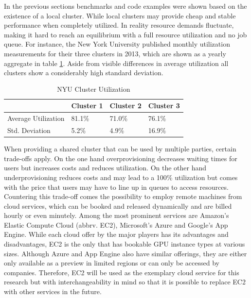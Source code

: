 In the previous sections benchmarks and code examples were shown based on the existence of a local cluster.
While local clusters may provide cheap and stable performance when completely utilized. In reality resource demands fluctuate, making it hard to reach an equilibrium with a full resource utilization and no job queue. For instance, the New York University published monthly utilization measurements for their three clusters in 2013\cite{nyu}, which are shown as a yearly aggregate in table \ref{table:cluster_utilization}. Aside from visible differences in average utilization all clusters show a considerably high standard deviation.

\begin{table}[!htb]
	\centering
	\begin{adjustbox}{width=0.5\textwidth}
		\small
		\begin{tabular}{l | l | l | l}
			~						& Cluster 1	& Cluster 2	& Cluster 3                 \\
			\hline
			Average Utilization 	& 81.1\%  	& 71.0\% 	& 76.1\% \\
			Std. Deviation          & 5.2\%  	& 4.9\%		& 16.9\% \\
		\end{tabular}
	\end{adjustbox}
	
	\caption{NYU Cluster Utilization}
	\label{table:cluster_utilization}
\end{table}

When providing a shared cluster that can be used by multiple parties, certain trade-offs apply. On the one hand overprovisioning decreases waiting times for users but increases costs and reduces utilization. On the other hand underprovisioning reduces costs and may lead to a 100\% utilization but comes with the price that users may have to line up in queues to access resources. Countering this trade-off comes the possibility to employ remote machines from cloud services, which can be booked and released dynamically and are billed hourly or even minutely. Among the most prominent services are Amazon's Elastic Compute Cloud (abbrv. EC2), Microsoft's Azure and Google's App Engine. While each cloud offer by the major players has its advantages and disadvantages, EC2 is the only that has bookable GPU instance types at various sizes. Although Azure and App Engine also have similar offerings, they are either only available as a preview in limited regions or can only be accessed by companies. Therefore, EC2 will be used as the exemplary cloud service for this research but with interchangeability in mind so that it is possible to replace EC2 with other services in the future.

